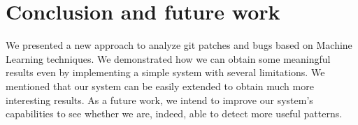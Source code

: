 \section{Conclusion and future work}
\label{sec:conclusion}

We presented a new approach to analyze git patches and bugs based on Machine Learning techniques. We demonstrated how we can obtain some meaningful results even by implementing a simple system with several limitations. We mentioned that our system can be easily extended to obtain much more interesting results. As a future work, we intend to improve our system's capabilities to see whether we are, indeed, able to detect more useful patterns.
